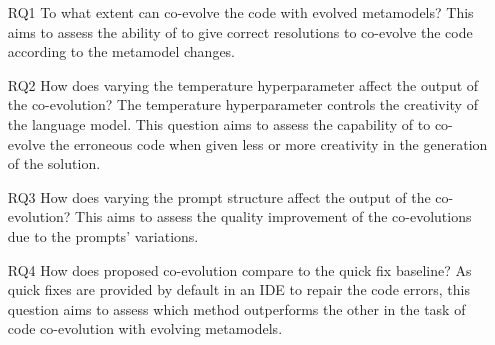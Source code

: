 \begin{itemize}
	\item[RQ1] %
	To what extent can \LLM co-evolve the code with evolved metamodels? 
	This aims to assess the ability of \LLM to give correct resolutions to co-evolve the code according to the metamodel changes.
	
	\item[RQ2] %
	How does varying the temperature hyperparameter affect the output of the co-evolution? %
	The temperature hyperparameter controls the creativity of the language model. 
	This question aims to assess the capability of \LLM to co-evolve the erroneous code when given less or more creativity in the generation of the solution. 
	
	
	\item[RQ3] %
	How does varying the prompt structure affect the output of the co-evolution? %
	This aims to assess the quality improvement of the co-evolutions due to the prompts' variations.
	
	
	\item[RQ4] %
	How does \LLM proposed co-evolution compare to the quick fix baseline? 
	As quick fixes are provided by default in an IDE to repair the code errors, this question aims to assess which method outperforms the other in the task of code co-evolution with evolving metamodels. %
	
	
\end{itemize}



